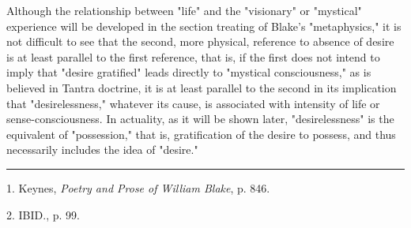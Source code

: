 \hspace*{5mm}Although the relationship between "life" and the "visionary" or "mystical" experience will be developed in the
section treating of Blake's "metaphysics," it is not difficult to see that the second, more physical, reference
to absence of desire is at least parallel to the first reference, that is, if the first does not intend to imply
that "desire gratified" leads directly to "mystical consciousness," as is believed in Tantra doctrine, it
is at least parallel to the second in its implication that "desirelessness," whatever its cause,
is associated with intensity of life or sense-consciousness. In actuality, as it will be shown later, "desirelessness"
is the equivalent of "possession," that is, gratification of the desire to possess, and thus necessarily includes the
idea of "desire."\par
\vspace*{\fill}
\noindent\rule{0.25\textwidth}{0.4pt}\par
1. Keynes, \textit{Poetry and Prose of William Blake}, p. 846.\par
2. IBID., p. 99.\par

\newpage

